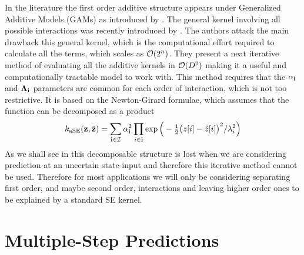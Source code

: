In the literature the first order additive structure appears under Generalized Additive Models (GAMs) as introduced by \cite{HT90}. The general kernel involving all possible interactions was recently introduced by \cite{DNR11}. The authors attack the main drawback this general kernel, which is the computational effort required to calculate all the terms, which scales as $\mathcal{O}(2^n)$. They present a neat iterative method of evaluating all the additive kernels in $\mathcal{O}(D^2)$ making it a useful and computationally tractable model to work with. This method requires that the $\alpha_{\mathbf{i}}$ and $\boldsymbol{\Lambda}_{\mathbf{i}}$ parameters are common for each order of interaction, which is not too restrictive. It is based on the Newton-Girard formulae, which assumes that the function can be decomposed as a product
\begin{equation*}
k_{\text{aSE}}(\mathbf{z},\tilde{\mathbf{z}}) = \sum_{\mathbf{i} \in \mathcal{I}} \alpha_{\mathbf{i}}^2 \prod_{i\in \mathbf{i}} \exp\Big(-\tfrac{1}{2}\big(z[i] - \tilde z[i]\big)^2/\lambda_{i}^{2} \Big)
\end{equation*}
As we shall see in  this decomposable structure is lost when we are considering prediction at an uncertain state-input and therefore this iterative method cannot be used. Therefore for most applications we will only be considering separating first order, and maybe second order, interactions and leaving higher order ones to be explained by a standard SE kernel.







\section{Multiple-Step Predictions} \label{sec:multistep}
